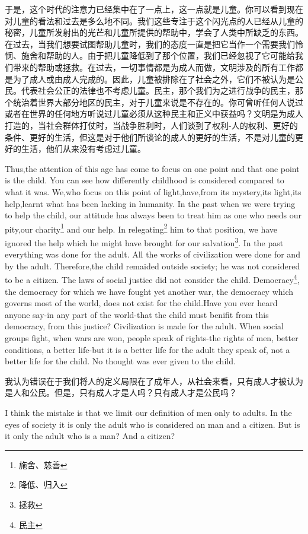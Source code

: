 \documentclass[lang=cn,10pt]{elegantbook}
\begin{document}
于是，这个时代的注意力已经集中在了一点上，这一点就是儿童。你可以看到现在对儿童的看法和过去是多么地不同。我们这些专注于这个闪光点的人已经从儿童的秘密，儿童所发射出的光芒和儿童所提供的帮助中，学会了人类中所缺乏的东西。在过去，当我们想要试图帮助儿童时，我们的态度一直是把它当作一个需要我们怜悯、施舍和帮助的人。由于把儿童降低到了那个位置，我们已经忽视了它可能给我们带来的帮助或拯救。在过去，一切事情都是为成人而做，文明涉及的所有工作都是为了成人或由成人完成的。因此，儿童被排除在了社会之外，它们不被认为是公民。代表社会公正的法律也不考虑儿童。民主，那个我们为之进行战争的民主，那个统治着世界大部分地区的民主，对于儿童来说是不存在的。你可曾听任何人说过或者在世界的任何地方听说过儿童必须从这种民主和正义中获益吗？文明是为成人打造的，当社会群体打仗时，当战争胜利时，人们谈到了权利-人的权利、更好的条件、更好的生活，但这是对于他们所谈论的成人的更好的生活，不是对儿童的更好的生活，他们从来没有考虑过儿童。

Thus,the attention of this age has come to focus on one point and that one point is the child. You can see how differently childhood is considered compared to what it was. We,who focus on this point of light,have,from its mystery,its light,its help,learnt what has been lacking in humanity. In the past when we were trying to help the child, our attitude has always been to treat him as one who needs our pity,our charity\footnote{施舍、慈善} and our help. In relegating\footnote{降低、归入} him to that position, we have ignored the help which he might have brought for our salvation\footnote{拯救}. In the past everything was done for the adult. All the works of civilization were done for and by the adult. Therefore,the child remaided outside society; he was not considered to be a citizen. The laws of social justice did not consider the child. Democracy\footnote{民主}, the democracy for which we have fought yet another war, the democracy which governs most of the world, does not exist for the child.Have you ever heard anyone say-in any part of the world-that the child must benifit from this democracy, from this justice? Civilization is made for the adult. When social groups fight, when wars are won, people speak of rights-the rights of men, better conditions, a better life-but it is a better life for the adult they speak of, not a better life for the child. No thought was ever given to the child.

我认为错误在于我们将人的定义局限在了成年人，从社会来看，只有成人才被认为是人和公民。但是，只有成人才是人吗？只有成人才是公民吗？

I think the mistake is that we limit our definition of men only to adults. In the eyes of society it is only the adult who is considered an man and a citizen. But is it only the adult who is a man? And a citizen?
\end{document}
